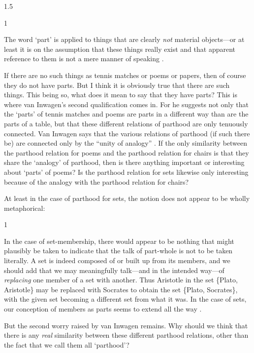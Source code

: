 \documentclass[11pt]{article}
\newenvironment{squote}{%
\begin{spacing}{1}
\begin{list}{}{%
\setlength{\labelwidth}{0pt}%
\rightmargin\leftmargin%
}
\item\relax
}{%
\end{list}%
\end{spacing}
}
\begin{document}
\begin{spacing}{1.5}
\begin{squote}
The word `part' is applied to things that are clearly \emph{not}
material objects---or at least it is on the assumption that these
things really exist and that apparent reference to them is not a mere
manner of speaking \citep[19]{inwagen1995}.
\end{squote}

If there are no such things as tennis matches or poems or papers, then
of course they do not have parts.  But I think it is obviously true
that there are such things.  This being so, what does it mean to say
that they have parts?  This is where van Inwagen's second
qualification comes in.  For he suggests not only that the `parts' of
tennis matches and poems are parts in a different way than are the
parts of a table, but that these different relations of parthood are
only tenuously connected.  Van Inwagen says that the various relations
of parthood (if such there be) are connected only by the ``unity of
analogy'' \citeyearpar[19]{inwagen1995}.  If the only similarity
between the parthood relation for poems and the parthood relation for
chairs is that they share the `analogy' of parthood, then is there
anything important or interesting about `parts' of poems?  Is the
parthood relation for sets likewise only interesting because of the
analogy with the parthood relation for chairs?

At least in the case of parthood for sets, the notion does not appear
to be wholly metaphorical:

\begin{squote}
In the case of set-membership, there would appear to be nothing that
might plausibly be taken to indicate that the talk of part-whole is
not to be taken literally. A set is indeed composed of or built up
from its members, and we should add that we may meaningfully
talk---and in the intended way---of \emph{replacing} one member of a
set with another.  Thus Aristotle in the set \{Plato, Aristotle\} may
be replaced with Socrates to obtain the set \{Plato, Socrates\}, with
the given set becoming a different set from what it was. In the case
of sets, our conception of members as parts seems to extend all the
way \citep[564]{fine2010}.
\end{squote}

But the second worry raised by van Inwagen remains.  Why should we
think that there is any {\em real} similarity between these different
parthood relations, other than the fact that we call them all
`parthood'?


\end{spacing}
\end{document}

